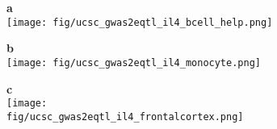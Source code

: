 %
%
%
%

%
%

\begin{figure}[!ht]
    \centering

    \begin{subfigure}[]{0.99\textwidth}
        \textbf{a}
        \\
        \texttt{[image: fig/ucsc\_gwas2eqtl\_il4\_bcell\_help.png]}
    \end{subfigure}

    \begin{subfigure}[]{0.99\textwidth}
        \textbf{b}
        \\
        \texttt{[image: fig/ucsc\_gwas2eqtl\_il4\_monocyte.png]}
    \end{subfigure}

    \begin{subfigure}[]{0.99\textwidth}
        \textbf{c}
        \\
        \texttt{[image: fig/ucsc\_gwas2eqtl\_il4\_frontalcortex.png]}
    \end{subfigure}

    \caption{}

\end{figure}

